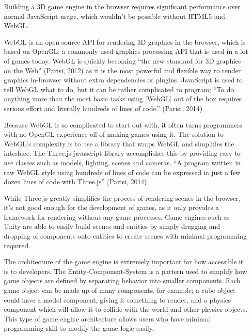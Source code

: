 \documentclass[a4paper, 12pt]{article}
\begin{document}


Building a 3D game engine in the browser requires significant performance over normal JavaScript usage, which wouldn't be possible without HTML5 and WebGL. 



WebGL is an open-source API for rendering 3D graphics in the browser, which is based on OpenGL; a commonly used graphics processing API that is used in a lot of games today. WebGL is quickly becoming ``the new standard for 3D graphics on the Web'' (Parisi, 2012) as it is the most powerful and flexible way to render graphics in-browser without extra dependencies or plugins. JavaScript is used to tell WebGL what to do, but it can be rather complicated to program; ``To do anything more than the most basic tasks using [WebGL] out of the box requires serious effort and literally hundreds of lines of code.'' (Parisi, 2014)



Because WebGL is so complicated to start out with, it often turns programmers with no OpenGL experience off of making games using it. The solution to WebGL's complexity is to use a library that wraps WebGL and simplifies the interface. The Three.js javascript library accomplishes this by providing easy to use classes such as models, lighting, scenes and cameras. ``A program written in raw WebGL style using hundreds of lines of code can be expressed in just a few dozen lines of code with Three.js'' (Parisi, 2014)



While Three.js greatly simplifies the process of rendering scenes in the browser, it's not good enough for the development of games, as it only provides a framework for rendering without any game processes. Game engines such as Unity are able to easily build scenes and entities by simply dragging and dropping of components onto entities to create scenes with minimal programming required. 



The architecture of the game engine is extremely important for how accessible it is to developers. The Entity-Component-System is a pattern used to simplify how game objects are defined by separating behavior into smaller components. Each game object can be made up of many components, for example; a cube object could have a model component, giving it something to render, and a physics component which will allow it to collide with the world and other physics objects. This type of game engine architecture allows users who have minimal programming skill to modify the game logic easily.
\end{document}
